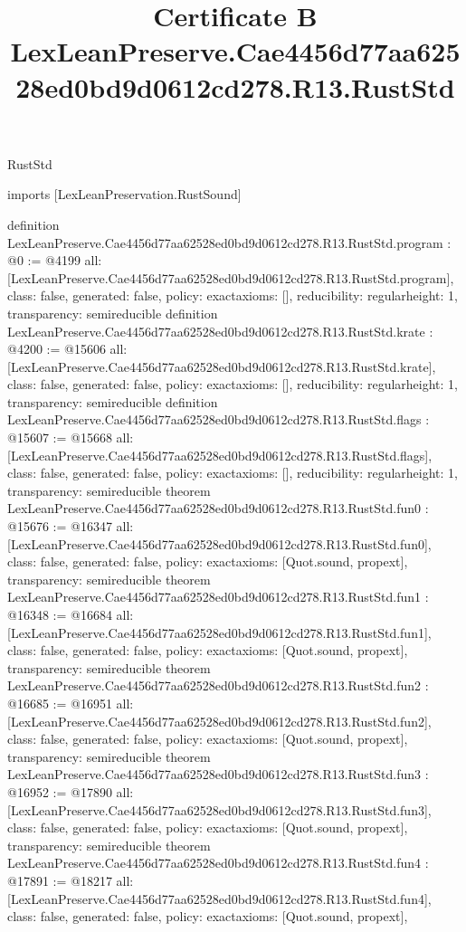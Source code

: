 \begin{lexlean}{RustStd}
\title{Certificate B LexLeanPreserve.Cae4456d77aa62528ed0bd9d0612cd278.R13.RustStd}
\begin{coremodule}
imports [LexLeanPreservation.RustSound]

definition LexLeanPreserve.Cae4456d77aa62528ed0bd9d0612cd278.R13.RustStd.program : @0 := @4199 {
  all: [LexLeanPreserve.Cae4456d77aa62528ed0bd9d0612cd278.R13.RustStd.program],
  class: false,
  generated: false,
  policy: exact{axioms: []},
  reducibility: regular{height: 1},
  transparency: semireducible
}
definition LexLeanPreserve.Cae4456d77aa62528ed0bd9d0612cd278.R13.RustStd.krate : @4200 := @15606 {
  all: [LexLeanPreserve.Cae4456d77aa62528ed0bd9d0612cd278.R13.RustStd.krate],
  class: false,
  generated: false,
  policy: exact{axioms: []},
  reducibility: regular{height: 1},
  transparency: semireducible
}
definition LexLeanPreserve.Cae4456d77aa62528ed0bd9d0612cd278.R13.RustStd.flags : @15607 := @15668 {
  all: [LexLeanPreserve.Cae4456d77aa62528ed0bd9d0612cd278.R13.RustStd.flags],
  class: false,
  generated: false,
  policy: exact{axioms: []},
  reducibility: regular{height: 1},
  transparency: semireducible
}
theorem LexLeanPreserve.Cae4456d77aa62528ed0bd9d0612cd278.R13.RustStd.fun0 : @15676 := @16347 {
  all: [LexLeanPreserve.Cae4456d77aa62528ed0bd9d0612cd278.R13.RustStd.fun0],
  class: false,
  generated: false,
  policy: exact{axioms: [Quot.sound, propext]},
  transparency: semireducible
}
theorem LexLeanPreserve.Cae4456d77aa62528ed0bd9d0612cd278.R13.RustStd.fun1 : @16348 := @16684 {
  all: [LexLeanPreserve.Cae4456d77aa62528ed0bd9d0612cd278.R13.RustStd.fun1],
  class: false,
  generated: false,
  policy: exact{axioms: [Quot.sound, propext]},
  transparency: semireducible
}
theorem LexLeanPreserve.Cae4456d77aa62528ed0bd9d0612cd278.R13.RustStd.fun2 : @16685 := @16951 {
  all: [LexLeanPreserve.Cae4456d77aa62528ed0bd9d0612cd278.R13.RustStd.fun2],
  class: false,
  generated: false,
  policy: exact{axioms: [Quot.sound, propext]},
  transparency: semireducible
}
theorem LexLeanPreserve.Cae4456d77aa62528ed0bd9d0612cd278.R13.RustStd.fun3 : @16952 := @17890 {
  all: [LexLeanPreserve.Cae4456d77aa62528ed0bd9d0612cd278.R13.RustStd.fun3],
  class: false,
  generated: false,
  policy: exact{axioms: [Quot.sound, propext]},
  transparency: semireducible
}
theorem LexLeanPreserve.Cae4456d77aa62528ed0bd9d0612cd278.R13.RustStd.fun4 : @17891 := @18217 {
  all: [LexLeanPreserve.Cae4456d77aa62528ed0bd9d0612cd278.R13.RustStd.fun4],
  class: false,
  generated: false,
  policy: exact{axioms: [Quot.sound, propext]},
}
\end{coremodule}
\end{lexlean}
